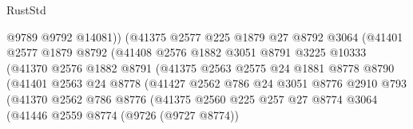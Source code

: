 \begin{lexlean}{RustStd}
\begin{coremodule}
                                @9789
                                @9792
                                @14081))
                            (@41375
                              @2577
                              @225
                              @1879
                              @27
                              @8792
                              @3064
                              (@41401
                                @2577
                                @1879
                                @8792
                                (@41408
                                  @2576
                                  @1882
                                  @3051
                                  @8791
                                  @3225
                                  @10333
                                  (@41370
                                    @2576
                                    @1882
                                    @8791
                                    (@41375
                                      @2563
                                      @2575
                                      @24
                                      @1881
                                      @8778
                                      @8790
                                      (@41401
                                        @2563
                                        @24
                                        @8778
                                        (@41427
                                          @2562
                                          @786
                                          @24
                                          @3051
                                          @8776
                                          @2910
                                          @793
                                          (@41370
                                            @2562
                                            @786
                                            @8776
                                            (@41375
                                              @2560
                                              @225
                                              @257
                                              @27
                                              @8774
                                              @3064
                                              (@41446
                                                @2559
                                                @8774
                                                (@9726 (@9727 @8774))

\end{coremodule}
\end{lexlean}
